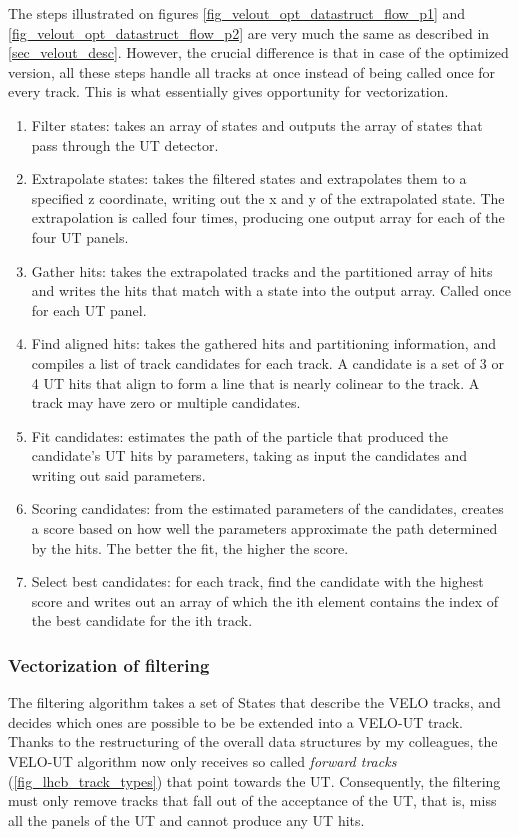 \documentclass[12pt]{article}
\begin{document}
The steps illustrated on figures \ref{fig_velout_opt_datastruct_flow_p1} and \ref{fig_velout_opt_datastruct_flow_p2} are very much the same as described in \ref{sec_velout_desc}. However, the crucial difference is that in case of the optimized version, all these steps handle all tracks at once instead of being called once for every track. This is what essentially gives opportunity for vectorization.

\begin{enumerate}
	\item Filter states: takes an array of states and outputs the array of states that pass through the UT detector.
	\item Extrapolate states: takes the filtered states and extrapolates them to a specified z coordinate, writing out the x and y of the extrapolated state. The extrapolation is called four times, producing one output array for each of the four UT panels.
	\item Gather hits: takes the extrapolated tracks and the partitioned array of hits and writes the hits that match with a state into the output array. Called once for each UT panel.
	\item Find aligned hits: takes the gathered hits and partitioning information, and compiles a list of track candidates for each track. A candidate is a set of 3 or 4 UT hits that align to form a line that is nearly colinear to the track. A track may have zero or multiple candidates.
	\item Fit candidates: estimates the path of the particle that produced the candidate's UT hits by parameters, taking as input the candidates and writing out said parameters.
	\item Scoring candidates: from the estimated parameters of the candidates, creates a score based on how well the parameters approximate the path determined by the hits. The better the fit, the higher the score.
	\item Select best candidates: for each track, find the candidate with the highest score and writes out an array of which the ith element contains the index of the best candidate for the ith track.
\end{enumerate}


\subsubsection{Vectorization of filtering}\label{sec_velout_filtering_vect}

The filtering algorithm takes a set of States that describe the VELO tracks, and decides which ones are possible to be be extended into a VELO-UT track. Thanks to the restructuring of the overall data structures by my colleagues, the VELO-UT algorithm now only receives so called \textit{forward tracks} (\ref{fig_lhcb_track_types}) that point towards the UT. Consequently, the filtering must only remove tracks that fall out of the acceptance of the UT, that is, miss all the panels of the UT and cannot produce any UT hits.
\end{document}
